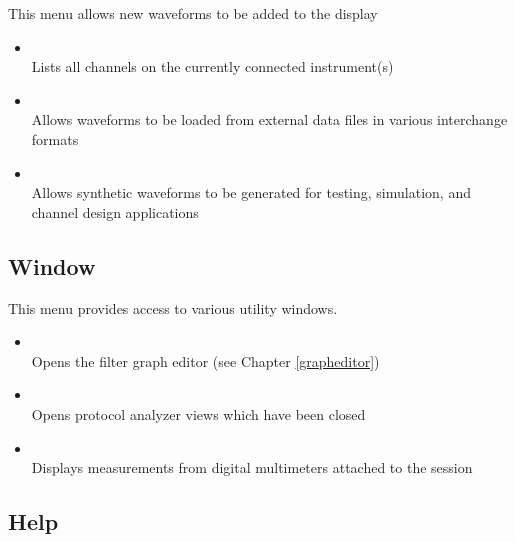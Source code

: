 This menu allows new waveforms to be added to the display

\begin{itemize}

\item {}\\
Lists all channels on the currently connected instrument(s)

\item {}\\
Allows waveforms to be loaded from external data files in various interchange formats

\item {}\\
Allows synthetic waveforms to be generated for testing, simulation, and channel design applications

\end{itemize}

\subsection{Window}

This menu provides access to various utility windows.

\begin{itemize}

\item {}\\
Opens the filter graph editor (see Chapter \ref{grapheditor})

\item {}\\
Opens protocol analyzer views which have been closed

\item {}\\
Displays measurements from digital multimeters attached to the session

\end{itemize}


\subsection{Help}

